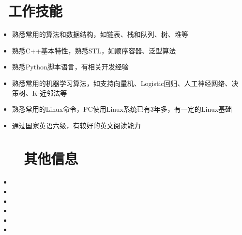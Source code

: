 \documentclass{resume}
\begin{document}
\section{\faCogs\ 工作技能}
\begin{itemize}[parsep=0.5ex]
  \item 熟悉常用的算法和数据结构，如链表、栈和队列、树、堆等
  \item 熟悉C++基本特性，熟悉STL，如顺序容器、泛型算法
  \item 熟悉Python脚本语言，有相关开发经验
  \item 熟悉常用的机器学习算法，如支持向量机、Logistic回归、人工神经网络、决策树、K-近邻法等
  \item 熟悉常用的Linux命令，PC使用Linux系统已有3年多，有一定的Linux基础
  \item 通过国家英语六级，有较好的英文阅读能力
\end{itemize}



\section{~\faInfo~\ 其他信息}
\begin{itemize}[parsep=0.5ex]
  \item {}
  \item {}
  \item {}
  \item {}
  \item {}
  \item {}
\end{itemize}
\end{document}
